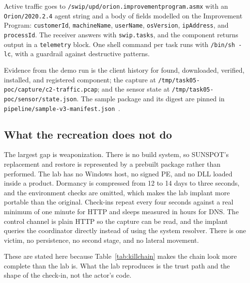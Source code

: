 Active traffic goes to \texttt{/swip/upd/orion.improvementprogram.asmx} with an \texttt{Orion/2020.2.4} agent string and a body of fields modelled on the Improvement Program: \texttt{customerId}, \texttt{machineName}, \texttt{userName}, \texttt{osVersion}, \texttt{ipAddress}, and \texttt{processId}. The receiver answers with \texttt{swip.tasks}, and the component returns output in a \texttt{telemetry} block. One shell command per task runs with \texttt{/bin/sh -lc}, with a guardrail against destructive patterns.

Evidence from the demo run is the client history for found, downloaded, verified, installed, and registered component; the capture at \texttt{/tmp/task05-poc/capture/c2-traffic.pcap}; and the sensor state at \texttt{/tmp/task05-poc/sensor/state.json}. The sample package and its digest are pinned in \texttt{pipeline/sample-v3-manifest.json}~\cite{task05lab}.

\subsection{What the recreation does not do}

The largest gap is weaponization. There is no build system, so SUNSPOT's replacement and restore is represented by a prebuilt package rather than performed. The lab has no Windows host, no signed PE, and no DLL loaded inside a product. Dormancy is compressed from 12 to 14 days to three seconds, and the environment checks are omitted, which makes the lab implant more portable than the original. Check-ins repeat every four seconds against a real minimum of one minute for HTTP and sleeps measured in hours for DNS. The control channel is plain HTTP so the capture can be read, and the implant queries the coordinator directly instead of using the system resolver. There is one victim, no persistence, no second stage, and no lateral movement.

These are stated here because Table~\ref{tab:killchain} makes the chain look more complete than the lab is. What the lab reproduces is the trust path and the shape of the check-in, not the actor's code.
